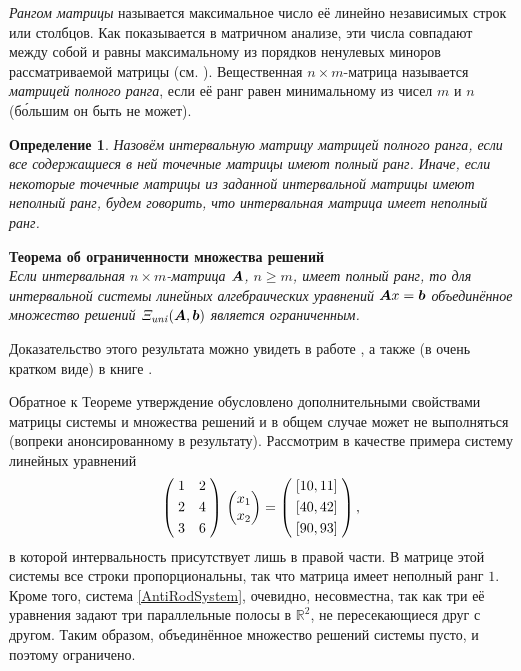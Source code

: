 \documentclass[a5paper,openany]{book}
\newcommand{\mbf}[1]{\protect\text{\boldmath$#1$}}
\newcommand{\mbb}{\mathbb}
\newcommand{\USS}{\varXi_\mathit{\hspace{-0.5pt}uni}}
\newtheorem{definition}{Определение}[section]
\begin{document}
\emph{Рангом матрицы} называется максимальное число её линейно независимых строк или 
столбцов. Как показывается в матричном анализе, эти числа совпадают 
между собой и равны максимальному из порядков ненулевых миноров рассматриваемой матрицы  
(см. \cite{Gantmacher, Lankaster,HornJohn}). Вещественная $n\times m$-матрица называется 
\emph{матрицей полного ранга}, если её ранг равен минимальному из чисел $m$ и $n$ 
(б\'{о}льшим он быть не может).  
  
\begin{definition}   
Назовём интервальную матрицу \textsl{матрицей полного ранга}, если все содержащиеся в ней 
точечные матрицы имеют полный ранг. Иначе, если некоторые точечные матрицы из заданной 
интервальной матрицы имеют неполный ранг, будем говорить, что интервальная матрица имеет 
\textsl{неполный ранг}. 
\end{definition} 
  
\addvspace{\bigskipamount}\noindent  
\textbf{Теорема об ограниченности множества решений}\\ 
{\sl Если интервальная $n\times m$-матрица $\mbf{A}$, $n\geq m$, имеет полный ранг, 
то для интервальной системы линейных алгебраических уравнений $\mbf{A}x = \mbf{b}$ 
объединённое множество решений $\USS(\mbf{A}, \mbf{b})$ является ограниченным.}  
  
\bigskip   
Доказательство этого результата можно увидеть в работе \cite{SSharySibJCM}, а также 
(в очень кратком виде) в книге \cite{NeumaierBook}. 
  
Обратное к Теореме утверждение обусловлено дополнительными свойствами матрицы системы 
и множества решений и в общем случае может не выполняться (вопреки анонсированному 
в \cite{Rodionova} результату). Рассмотрим в качестве примера систему линейных уравнений 
\begin{equation}
\label{AntiRodSystem}
\left(
\begin{array}{@{\;}cc@{\;}}
1 & 2\\[3pt]
2 & 4\\[3pt]
3 & 6 
\end{array}
\right)\,
\begin{pmatrix}
x_{1} \\ x_{2}  
\end{pmatrix} 
=  \left(  
\begin{array}{@{\;}c@{\;}}
[10, 11]\\[3pt]
[40, 42]\\[3pt]
[90, 93] 
\end{array}
\right), 
\end{equation} 
в которой интервальность присутствует лишь в правой части. В матрице этой системы 
все строки пропорциональны, так что матрица имеет неполный ранг $1$. Кроме того, 
система \eqref{AntiRodSystem}, очевидно, несовместна, так как три её уравнения задают 
три параллельные полосы в $\mbb{R}^2$, не пересекающиеся друг с другом. Таким образом, 
объединённое множество решений системы пусто, и поэтому ограничено. 
  
\end{document}
